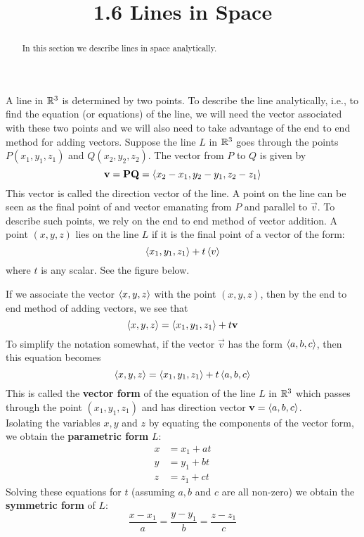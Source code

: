 \documentclass[handout]{ximera}
\title{1.6 Lines in Space}
\begin{document}
\begin{abstract}
In this section we describe lines in space analytically.
\end{abstract}
 
\maketitle

A line in $\mathbb R^3$ is determined by two points. To describe the line analytically, i.e., to find the equation (or equations) of the line,
we will need the vector associated with these two points and we will also need to take advantage of the end to end method for adding vectors.
Suppose the line $L$ in $\mathbb R^3$ goes through the points $P(x_1, y_1, z_1)$ and $Q(x_2, y_2, z_2)$. The vector from $P$ to $Q$ is given by
\[
\mathbf{v} = \mathbf{PQ} = \left\langle x_2-x_1,y_2-y_1,z_2-z_1\right\rangle
\]
This vector is called the direction vector of the line. 
A point on the line can be seen as the final point of and vector emanating from $P$ and parallel to $\vec{v}$.
To describe such points, we rely on the end to end method of vector addition. A point $(x, y, z)$ lies on the line $L$ if
it is the final point of a vector of the form:
\[
\left\langle x_1, y_1, z_1\right\rangle + t\left\langle v\right\rangle
\]
where $t$ is any scalar. See the figure below.

\begin{image}
\end{image}
 
If we associate the vector $\left\langle x, y, z\right\rangle$ with the point $(x, y, z)$, then by the end to end method of adding vectors, we see that
\[
\left\langle x, y, z\right\rangle = \left\langle x_1, y_1, z_1\right\rangle + t\mathbf{v}
\]
To simplify the notation somewhat, if the vector $\vec{v}$ has the form $\left\langle a, b, c\right\rangle$, then this equation becomes
\[
\left\langle x, y, z\right\rangle = \left\langle x_1, y_1, z_1\right\rangle + t\left\langle a, b, c\right\rangle
\]
This is called the {\bf vector form} of the equation of the line $L$ in $\mathbb R^3$ which passes through the 
point $(x_1, y_1, z_1)$ and has direction vector $\mathbf{v} = \left\langle a, b, c\right\rangle$.\\
Isolating the variables $x, y$ and $z$ by equating the components of the vector form, we obtain the {\bf parametric form} $L$:
\begin{align*}
x &= x_1 + at\\
y &= y_1 + bt\\
z &= z_1 + ct
\end{align*}
Solving these equations for $t$ (assuming $a, b$ and $c$ are all non-zero) we obtain the {\bf symmetric form} of $L$:
\[
\frac{x-x_1}{a} = \frac{y-y_1}{b} = \frac{z-z_1}{c}
\]
\end{document}
